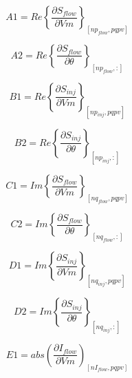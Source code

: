 \documentclass[nols,a4paper,twoside,notoc,fleqn]{tufte-book}
\begin{document}
\begin{equation}
A1 = Re \left\{   \frac{\partial S_{flow}}{\partial Vm}  \right\}_{[np_{flow}, pqpv]}
\end{equation}

\begin{equation}
A2 = Re \left\{\frac{\partial S_{flow}}{\partial \theta} \right\}_{[np_{flow}, :]}
\end{equation}

\begin{equation}
B1 = Re \left\{\frac{\partial S_{inj}}{\partial Vm} \right\}_{[np_{inj}, pqpv]}
\end{equation}


\begin{equation}
B2 = Re \left\{ \frac{\partial S_{inj}}{\partial \theta} \right\}_{[np_{inj}, :]}
\end{equation}


\begin{equation}
C1 = Im\left\{  \frac{\partial S_{flow}}{\partial Vm}\right\}_{[nq_{flow}, pqpv]}
\end{equation}


\begin{equation}
C2 = Im\left\{\frac{\partial S_{flow}}{\partial \theta}\right\}_{[nq_{flow}, :]}
\end{equation}

\begin{equation}
D1 = Im\left\{\frac{\partial S_{inj}}{\partial Vm}\right\}_{[nq_{inj}, pqpv]}
\end{equation}


\begin{equation}
D2 = Im\left\{\frac{\partial S_{inj}}{\partial \theta}\right\}_{[nq_{inj}, :]}
\end{equation}


\begin{equation}
E1 = abs\left(\frac{\partial I_{flow}}{\partial Vm}\right)_{[nI_{flow}, pqpv]}
\end{equation}
\end{document}
